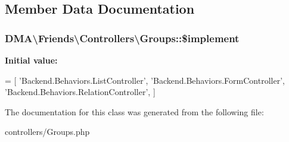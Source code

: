 \subsection{Member Data Documentation}
\hypertarget{classDMA_1_1Friends_1_1Controllers_1_1Groups_aa0c5c09b0b7f0628a1001a8397626577}{
\subsubsection[{\$implement}]{\setlength{\rightskip}{0pt plus 5cm}D\-M\-A\textbackslash{}\-Friends\textbackslash{}\-Controllers\textbackslash{}\-Groups\-::\$implement}}\label{classDMA_1_1Friends_1_1Controllers_1_1Groups_aa0c5c09b0b7f0628a1001a8397626577}
{\bfseries Initial value\-:}
\begin{DoxyCode}
= [
        \textcolor{stringliteral}{'Backend.Behaviors.ListController'},    
        \textcolor{stringliteral}{'Backend.Behaviors.FormController'},
        \textcolor{stringliteral}{'Backend.Behaviors.RelationController'},
    ]
\end{DoxyCode}


The documentation for this class was generated from the following file\-:\begin{DoxyCompactItemize}
\item 
controllers/Groups.\-php\end{DoxyCompactItemize}

